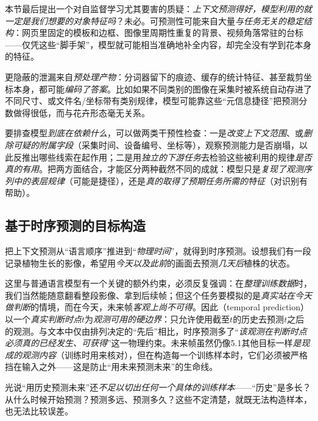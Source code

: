 本节最后提出一个对自监督学习尤其要害的质疑：\emph{上下文预测得好，模型利用的就一定是我们想要的对象特征吗}？未必。可预测性可能来自大量\emph{与任务无关的稳定结构}：网页里固定的模板和边框、图像里周期性重复的背景、视频角落常驻的台标——仅凭这些“脚手架”，模型就可能相当准确地补全内容，却完全没有学到花本身的特征。

更隐蔽的泄漏来自\emph{预处理产物}：分词器留下的痕迹、缓存的统计特征、甚至裁剪坐标本身，都可能\emph{编码了答案}。比如如果不同类别的图像在采集时被系统自动存进了不同尺寸、或文件名/坐标带有类别规律，模型可能靠这些“元信息捷径”把预测分数做得很低，而与花卉形态毫无关系。

要排查模型\emph{到底在依赖什么}，可以做两类干预性检查：一是\emph{改变上下文范围}、或\emph{删除可疑的附属字段}（采集时间、设备编号、坐标等），观察预测能力是否崩塌，以此反推出哪些线索在起作用；二是用\emph{独立的下游任务}去检验这些被利用的规律\emph{是否真的有用}。把两方面结合，才能区分两种截然不同的成就：模型只是\emph{复现了观测序列中的表层规律}（可能是捷径），还是\emph{真的取得了预期任务所需的特征}（对识别有帮助）。

\subsection{基于时序预测的目标构造}
\label{sec:data-derived-knowledge-temporal-prediction}

把上下文预测从“语言顺序”推进到“\emph{物理时间}”，就得到时序预测。设想我们有一段记录植物生长的影像，希望用\emph{今天以及此前}的画面去预测\emph{几天后}植株的状态。

这里与普通语言模型有一个关键的额外约束，必须反复强调：在\emph{整理训练数据}时，我们当然能随意翻看整段影像、拿到后续帧；但这个任务要模拟的是\emph{真实站在今天做判断}的情境，而在今天，未来帧\emph{客观上尚不可得}。因此（temporal prediction）以一个\emph{真实判断时点}$t$为\emph{观测可用的硬边界}：只允许使用截至$t$的历史去预测$t$之后的观测。与文本中仅由排列决定的“先后”相比，时序预测多了“\emph{该观测在判断时点必须真的已经发生、可获得}”这一物理约束。未来帧虽然仍像5.1其他目标一样\emph{是现成的观测内容}（训练时用来核对），但在构造每一个训练样本时，它们必须被严格挡在输入之外——这是防止“用未来预测未来”的生命线。

光说“用历史预测未来”还\emph{不足以切出任何一个具体的训练样本}——“历史”是多长？从什么时候开始预测？预测多远、预测多久？这些不定清楚，就既无法构造样本，也无法比较误差。


